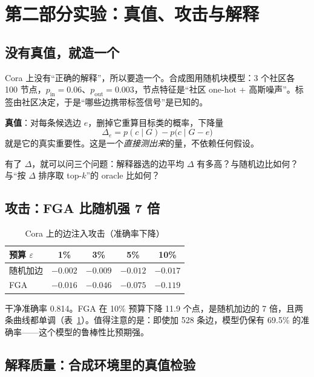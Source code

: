 \section{第二部分实验：真值、攻击与解释}\label{sec:noderes}

\subsection{没有真值，就造一个}

Cora 上没有“正确的解释”，所以要造一个。合成图用随机块模型：3 个社区各 100 节点，$p_{\text{in}}=0.06$、$p_{\text{out}}=0.003$，节点特征是“社区 one-hot + 高斯噪声”。标签由社区决定，于是“哪些边携带标签信号”是已知的。

\textbf{真值}：对每条候选边 $e$，删掉它重算目标类的概率，下降量
\begin{equation}
\Delta_e = p(c\mid G) - p\bigl(c\mid G-e\bigr)
\end{equation}
就是它的真实重要性。这是一个\emph{直接测出来}的量，不依赖任何假设。

有了 $\Delta$，就可以问三个问题：解释器选的边平均 $\Delta$ 有多高？与随机边比如何？与“按 $\Delta$ 排序取 top-$k$”的 oracle 比如何？

\subsection{攻击：FGA 比随机强 7 倍}

\begin{table}[H]
\centering
\caption{Cora 上的边注入攻击（准确率下降）}
\label{tab:attack}
\small
\begin{tabular}{lcccc}
\toprule
预算 $\varepsilon$ & 1\% & 3\% & 5\% & 10\% \\
\midrule
随机加边 & $-0.002$ & $-0.009$ & $-0.012$ & $-0.017$ \\
FGA & $-0.016$ & $-0.046$ & $-0.075$ & $\mathbf{-0.119}$ \\
\bottomrule
\end{tabular}
\end{table}

干净准确率 0.814。FGA 在 10\% 预算下降 11.9 个点，是随机加边的 7 倍，且两条曲线都单调（表~\ref{tab:attack}）。值得注意的是：即使加 528 条边，模型仍保有 69.5\% 的准确率——这个模型的鲁棒性比预期强。

\subsection{解释质量：合成环境里的真值检验}

